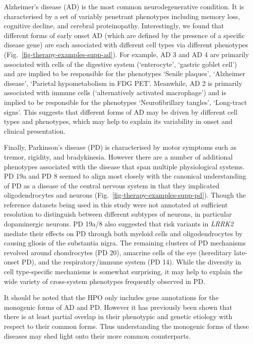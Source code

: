 \documentclass[
]{article}
\begin{document}
Alzheimer's disease (AD) is the most common neurodegenerative condition.
It is characterised by a set of variably penetrant phenotypes including
memory loss, cognitive decline, and cerebral proteinopathy.
Interestingly, we found that different forms of early onset AD (which
are defined by the presence of a specific disease gene) are each
associated with different cell types via different phenotypes
(Fig.~\ref{fig-therapy-examples-supp-ad}). For example, AD 3 and AD 4
are primarily associated with cells of the digestive system
(`enterocyte', `gastric goblet cell') and are implied to be responsible
for the phenotypes `Senile plaques', `Alzheimer disease', `Parietal
hypometabolism in FDG PET'. Meanwhile, AD 2 is primarily associated with
immune cells (`alternatively activated macrophage') and is implied to be
responsible for the phenotypes `Neurofibrillary tangles', `Long-tract
signs'. This suggests that different forms of AD may be driven by
different cell types and phenotypes, which may help to explain its
variability in onset and clinical presentation.

Finally, Parkinson's disease (PD) is characterised by motor symptoms
such as tremor, rigidity, and bradykinesia. However there are a number
of additional phenotypes associated with the disease that span multiple
physiological systems. PD 19a and PD 8 seemed to align most closely with
the canonical understanding of PD as a disease of the central nervous
system in that they implicated oligodendrocytes and neurons
(Fig.~\ref{fig-therapy-examples-supp-pd}). Though the reference datasets
being used in this study were not annotated at sufficient resolution to
distinguish between different subtypes of neurons, in particular
dopaminergic neurons. PD 19a/8 also suggested that risk variants in
\emph{LRRK2} mediate their effects on PD through both myeloid cells and
oligodendrocytes by causing gliosis of the substantia nigra. The
remaining clusters of PD mechanisms revolved around chondrocytes (PD
20), amacrine cells of the eye (hereditary late-onset PD), and the
respiratory/immune system (PD 14). While the diversity in cell
type-specific mechanisms is somewhat surprising, it may help to explain
the wide variety of cross-system phenotypes frequently observed in PD.

It should be noted that the HPO only includes gene annotations for the
monogenic forms of AD and PD. However it has previously been shown that
there is at least partial overlap in their phenotypic and genetic
etiology with respect to their common forms. Thus understanding the
monogenic forms of these diseases may shed light onto their more common
counterparts.
\end{document}
